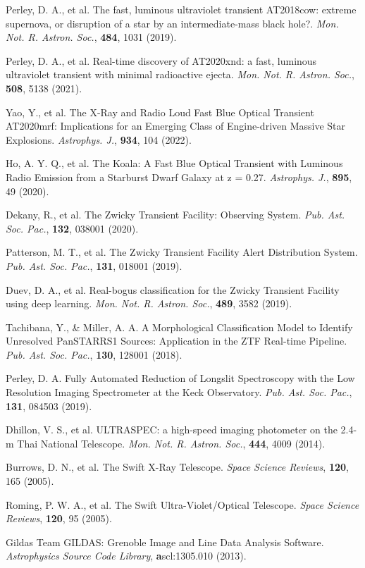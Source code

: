 \documentclass{nature_plusfigure}
\newcommand{\mn}{{Mon. Not. R. Astron. Soc.}}
\newcommand{\mnras}{\mn}
\newcommand{\apj}{{Astrophys. J.}}
\newcommand{\pasp}{{Pub. Ast. Soc. Pac.}}
\newcommand{\ssr}{Space Science Reviews}
\begin{document}
\begin{methods}
\begin{thebibliography}{10}
 Perley, D. A., et al. The fast, luminous ultraviolet transient AT2018cow: extreme supernova, or disruption of a star by an intermediate-mass black hole?. \emph{\mnras}, \textbf{484}, 1031 (2019). 

 Perley, D. A., et al. Real-time discovery of AT2020xnd: a fast, luminous ultraviolet transient with minimal radioactive ejecta. \emph{\mnras}, \textbf{508}, 5138 (2021). 

 Yao, Y., et al. The X-Ray and Radio Loud Fast Blue Optical Transient AT2020mrf: Implications for an Emerging Class of Engine-driven Massive Star Explosions. \emph{\apj}, \textbf{934}, 104 (2022). 

 Ho, A. Y. Q., et al. The Koala: A Fast Blue Optical Transient with Luminous Radio Emission from a Starburst Dwarf Galaxy at z = 0.27. \emph{\apj}, \textbf{895}, 49 (2020). 

  Dekany, R., et al. The Zwicky Transient Facility: Observing System. \emph{\pasp}, \textbf{132}, 038001 (2020). 

 Patterson, M. T., et al. The Zwicky Transient Facility Alert Distribution System. \emph{\pasp}, \textbf{131}, 018001 (2019). 

  Duev, D. A., et al. Real-bogus classification for the Zwicky Transient Facility using deep learning. \emph{\mnras}, \textbf{489}, 3582 (2019). 

 Tachibana, Y., \& Miller, A. A. A Morphological Classification Model to Identify Unresolved PanSTARRS1 Sources: Application in the ZTF Real-time Pipeline. \emph{\pasp}, \textbf{130}, 128001 (2018). 

 Perley, D. A. Fully Automated Reduction of Longslit Spectroscopy with the Low Resolution Imaging Spectrometer at the Keck Observatory. \emph{\pasp}, \textbf{131}, 084503 (2019). 

 Dhillon, V. S., et al. ULTRASPEC: a high-speed imaging photometer on the 2.4-m Thai National Telescope. \emph{\mnras}, \textbf{444}, 4009 (2014). 

 Burrows, D. N., et al. The Swift X-Ray Telescope. \emph{\ssr}, \textbf{120}, 165 (2005). 

 Roming, P. W. A., et al. The Swift Ultra-Violet/Optical Telescope. \emph{\ssr}, \textbf{120}, 95 (2005).

 Gildas Team GILDAS: Grenoble Image and Line Data Analysis Software. \emph{Astrophysics Source Code Library}, \textbf ascl:1305.010 (2013). 


\end{thebibliography}
\end{methods}
\end{document}
